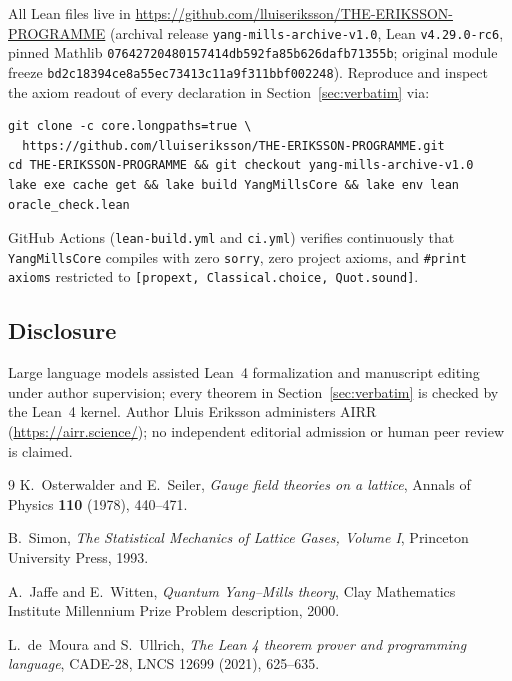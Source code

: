 \documentclass[11pt]{article}
\theoremstyle{remark}
\theoremstyle{definition}
\newcommand{\anchor}{bd2c18394ce8a55ec73413c11a9f311bbf002248}
\begin{document}
All Lean files live in \url{https://github.com/lluiseriksson/THE-ERIKSSON-PROGRAMME}
(archival release \texttt{yang-mills-archive-v1.0}, Lean \texttt{v4.29.0-rc6}, pinned
Mathlib \texttt{07642720480157414db592fa85b626dafb71355b}; original module freeze
\texttt{\anchor}). Reproduce and inspect the axiom readout of every declaration in
Section~\ref{sec:verbatim} via:
\begin{verbatim}
git clone -c core.longpaths=true \
  https://github.com/lluiseriksson/THE-ERIKSSON-PROGRAMME.git
cd THE-ERIKSSON-PROGRAMME && git checkout yang-mills-archive-v1.0
lake exe cache get && lake build YangMillsCore && lake env lean oracle_check.lean
\end{verbatim}
GitHub Actions (\texttt{lean-build.yml} and \texttt{ci.yml}) verifies continuously that
\texttt{YangMillsCore} compiles with zero \texttt{sorry}, zero project axioms, and
\texttt{\#print axioms} restricted to \texttt{[propext, Classical.choice, Quot.sound]}.

\subsection*{Disclosure}
Large language models assisted Lean~4 formalization and manuscript editing under author
supervision; every theorem in Section~\ref{sec:verbatim} is checked by the Lean~4 kernel.
Author Lluis Eriksson administers AIRR (\url{https://airr.science/}); no independent
editorial admission or human peer review is claimed.

\begin{thebibliography}{9}\small
{}
K.~Osterwalder and E.~Seiler, \emph{Gauge field theories on a lattice},
Annals of Physics \textbf{110} (1978), 440--471.

B.~Simon, \emph{The Statistical Mechanics of Lattice Gases, Volume I},
Princeton University Press, 1993.

A.~Jaffe and E.~Witten, \emph{Quantum Yang--Mills theory},
Clay Mathematics Institute Millennium Prize Problem description, 2000.

L.~de~Moura and S.~Ullrich, \emph{The Lean 4 theorem prover and programming language},
CADE-28, LNCS 12699 (2021), 625--635.
\end{thebibliography}
\end{document}
